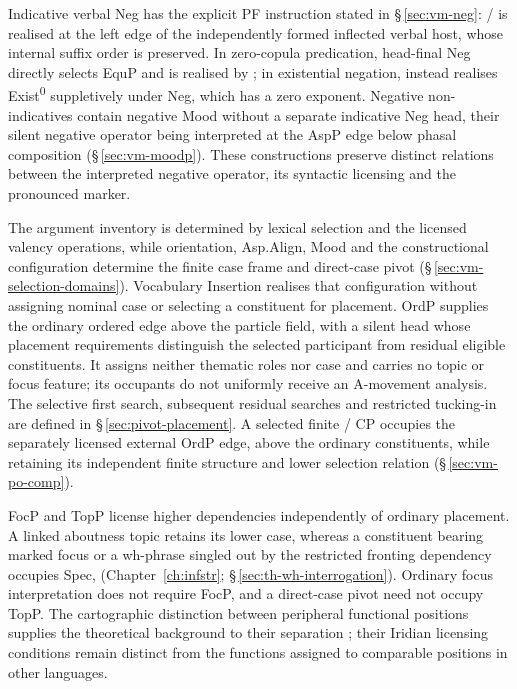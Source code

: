 Indicative verbal Neg has the explicit PF instruction stated in
§\,\ref{sec:vm-neg}: / is realised at the left edge
of the independently formed inflected verbal host, whose internal suffix
order is preserved. In zero-copula predication, head-final Neg directly
selects EquP and is realised by ; in existential negation,
 instead realises Exist\textsuperscript{0} suppletively under
Neg, which has a zero exponent. Negative non-indicatives contain negative
Mood without a separate indicative Neg head, their silent negative operator
being interpreted at the AspP edge below phasal composition
(§\,\ref{sec:vm-moodp}). These constructions preserve distinct relations
between the interpreted negative operator, its syntactic licensing and the
pronounced marker.

The argument inventory is determined by lexical selection and the licensed
valency operations, while orientation, Asp.Align, Mood and the constructional
configuration determine the finite case frame and direct-case pivot
(§\,\ref{sec:vm-selection-domains}). Vocabulary Insertion realises that
configuration without assigning nominal case or selecting a constituent for
placement. OrdP supplies the ordinary ordered edge above the particle field,
with a silent head whose placement requirements distinguish the selected
participant from residual eligible constituents. It assigns neither thematic
roles nor case and carries no topic or focus feature; its occupants do not
uniformly receive an A-movement analysis. The selective first search,
subsequent residual searches and restricted tucking-in are defined in
§\,\ref{sec:pivot-placement}. A selected finite / CP
occupies the separately licensed external OrdP edge, above the ordinary
constituents, while retaining its independent finite structure and lower
selection relation (§\,\ref{sec:vm-po-comp}).

FocP and TopP license higher dependencies independently of ordinary
placement. A linked aboutness topic retains its lower case, whereas a
constituent bearing marked focus or a wh-phrase singled out by the restricted
fronting dependency occupies Spec,
(Chapter~\ref{ch:infstr}; §\,\ref{sec:th-wh-interrogation}). Ordinary
focus interpretation does not require FocP, and a direct-case pivot need not
occupy TopP. The cartographic distinction between peripheral functional
positions supplies the theoretical background to their separation
\cite{rizzibocci2017}; their Iridian licensing conditions remain distinct
from the functions assigned to comparable positions in other languages.

